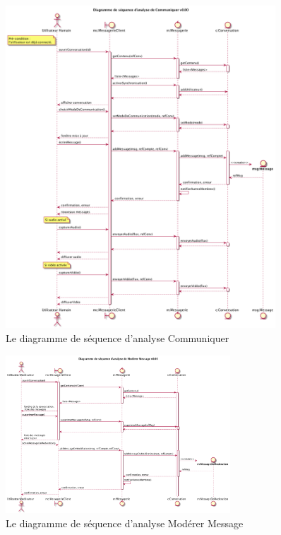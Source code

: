 \documentclass[11pt,dvipsnames,svgnames]{report}
\begin{document}
\begin{figure}[H]
\centerline{\includegraphics[width=0.9\textwidth]{diagrammes/dsa-communiquer.png}}
\caption{Le diagramme de séquence d'analyse \og Communiquer \fg}
\end{figure}

\begin{figure}[H]
\centerline{\includegraphics[width=0.75\textwidth]{diagrammes/dsa-moderer.png}}
\caption{Le diagramme de séquence d'analyse \og Modérer Message \fg}
\end{figure}
\end{document}

